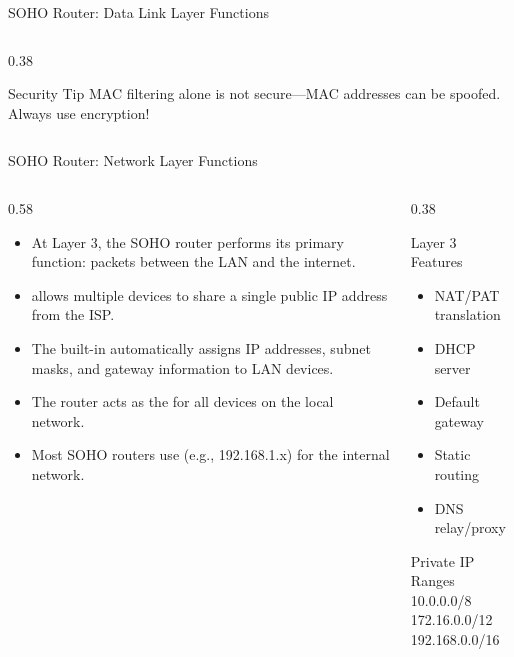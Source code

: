 \documentclass[aspectratio=169]{beamer}  %
\begin{document}
\begin{frame}{SOHO Router: Data Link Layer Functions}
\begin{columns}[T]
\begin{column}{0.38\textwidth}
            \vspace{0.3em}
            \begin{alertblock}{Security Tip}
                MAC filtering alone is not secure---MAC addresses can be spoofed. Always use encryption!
            \end{alertblock}
        \end{column}
    \end{columns}
\end{frame}

\begin{frame}{SOHO Router: Network Layer Functions}
    \begin{columns}[T]
        \begin{column}{0.58\textwidth}
            \begin{itemize}
                \item At Layer 3, the SOHO router performs its primary function:  packets between the LAN and the internet.
                \item {} allows multiple devices to share a single public IP address from the ISP.
                \item The built-in  automatically assigns IP addresses, subnet masks, and gateway information to LAN devices.
                \item The router acts as the  for all devices on the local network.
                \item Most SOHO routers use  (e.g., 192.168.1.x) for the internal network.
            \end{itemize}
        \end{column}
        \begin{column}{0.38\textwidth}
            \begin{block}{Layer 3 Features}
                \begin{itemize}
                    \item NAT/PAT translation
                    \item DHCP server
                    \item Default gateway
                    \item Static routing
                    \item DNS relay/proxy
                \end{itemize}
            \end{block}
            
            \vspace{0.3em}
            \begin{exampleblock}{Private IP Ranges}
                \small
                10.0.0.0/8 \\
                172.16.0.0/12 \\
                192.168.0.0/16
            \end{exampleblock}
        \end{column}
    \end{columns}
\end{frame}
\end{document}
